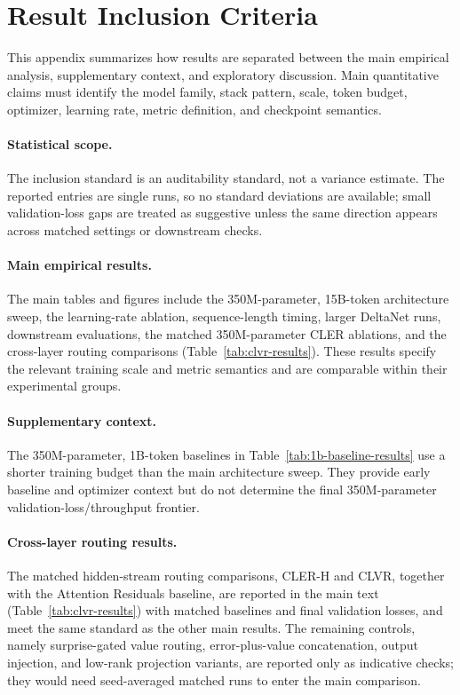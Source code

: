 \documentclass{article}
\begin{document}
\section{Result Inclusion Criteria}
\label{app:evidence-ledger}

This appendix summarizes how results are separated between the main empirical analysis, supplementary context, and exploratory discussion. Main quantitative claims must identify the model family, stack pattern, scale, token budget, optimizer, learning rate, metric definition, and checkpoint semantics.

\paragraph{Statistical scope.}
The inclusion standard is an auditability standard, not a variance estimate. The reported entries are single runs, so no standard deviations are available; small validation-loss gaps are treated as suggestive unless the same direction appears across matched settings or downstream checks.

\paragraph{Main empirical results.}
The main tables and figures include the 350M-parameter, 15B-token architecture sweep, the learning-rate ablation, sequence-length timing, larger DeltaNet runs, downstream evaluations, the matched 350M-parameter CLER ablations, and the cross-layer routing comparisons (Table~\ref{tab:clvr-results}). These results specify the relevant training scale and metric semantics and are comparable within their experimental groups.

\paragraph{Supplementary context.}
The 350M-parameter, 1B-token baselines in Table~\ref{tab:1b-baseline-results} use a shorter training budget than the main architecture sweep. They provide early baseline and optimizer context but do not determine the final 350M-parameter validation-loss/throughput frontier.

\paragraph{Cross-layer routing results.}
The matched hidden-stream routing comparisons, CLER-H and CLVR, together with the Attention Residuals baseline, are reported in the main text (Table~\ref{tab:clvr-results}) with matched baselines and final validation losses, and meet the same standard as the other main results. The remaining controls, namely surprise-gated value routing, error-plus-value concatenation, output injection, and low-rank projection variants, are reported only as indicative checks; they would need seed-averaged matched runs to enter the main comparison.
\end{document}
